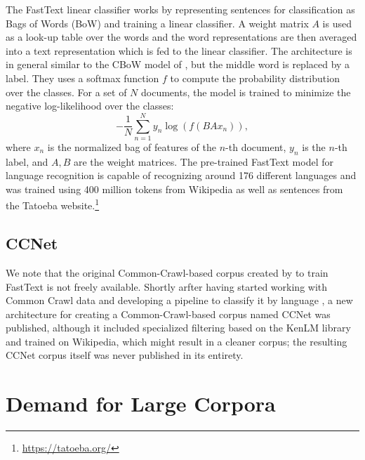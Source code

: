 The FastText linear classifier works by representing sentences for classification as Bags of Words (BoW) and training a linear classifier. A weight matrix $A$ is used as a look-up table over the words and the word representations are then averaged into a text representation which is fed to the linear classifier. The architecture is in general similar to the CBoW model of \citet{mikolov-etal-2013-distributed}, but the middle word is replaced by a label. They uses a softmax function $f$ to compute the probability distribution over the classes. For a set of $N$ documents, the model is trained to minimize the negative log-likelihood over the classes:
\[
    -\frac{1}{N}\sum_{n=1}^{N} y_n\log\left(f(BAx_n)\right),
\]
where $x_n$ is the normalized bag of features of the $n$-th document, $y_n$ is the $n$-th label, and $A,B$ are the weight matrices. The pre-trained FastText model for language recognition \citep{grave-etal-2018-learning} is capable of recognizing around 176 different languages and was trained using 400 million tokens from Wikipedia as well as sentences from the Tatoeba website.\footnote{\url{https://tatoeba.org/}}

\subsection{CCNet}

We note that the original Common-Crawl-based corpus created by \citet{grave-etal-2018-learning} to train FastText is not freely available. Shortly arfter having started working with Common Crawl data and developing a pipeline to classify it by language \citep{ortiz-suarez-etal-2019-asynchronous}, a new architecture for creating a Common-Crawl-based corpus named CCNet \citep{wenzek-etal-2020-ccnet} was published, although it included specialized filtering based on the KenLM library \citep{heafield-2011-kenlm} and trained on Wikipedia, which might result in a cleaner corpus; the resulting CCNet corpus itself was never published in its entirety.


\section{Demand for Large Corpora}

